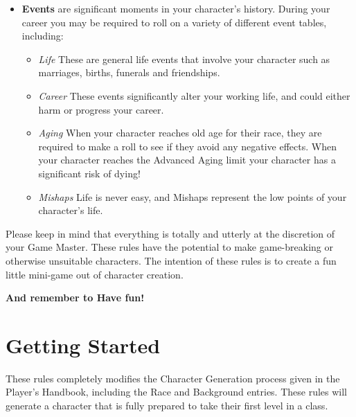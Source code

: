 \documentclass[10pt,twoside]{article}
\begin{document}
\begin{multicols}{2}
\begin{itemize}
\item \textbf{Events} are significant moments in your character’s history. During your career you may be required to roll on a variety of different event tables, including:

\begin{itemize}

\item \textit{Life} These are general life events that involve your character such as marriages, births, funerals and friendships.

\item \textit{Career} These events significantly alter your working life, and could either harm or progress your career.

\item \textit{Aging} When your character reaches old age for their race, they are required to make a roll to see if they avoid any negative effects. When your character reaches the Advanced Aging limit your character has a significant risk of dying!

\item \textit{Mishaps} Life is never easy, and Mishaps represent the low points of your character's life.
\end{itemize}

\end{itemize}

Please keep in mind that everything is totally and utterly at the discretion of your Game Master. These rules have the potential to make game-breaking or otherwise unsuitable characters. The intention of these rules is to create a fun little mini-game out of character creation.

\textbf{And remember to Have fun!}


\section{Getting Started}

These rules completely modifies the Character Generation process given in the Player's Handbook, including the Race and Background entries. These rules will generate a character that is fully prepared to take their first level in a class.


\end{multicols}
\end{document}
